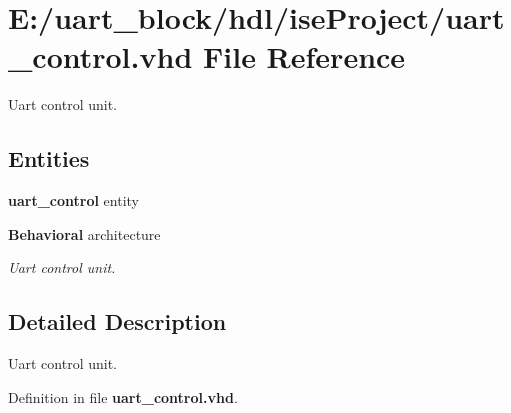 \section{E\-:/uart\-\_\-block/hdl/ise\-Project/uart\-\_\-control.vhd File Reference}
\label{uart__control_8vhd}


Uart control unit.  


\subsection*{Entities}
\begin{DoxyCompactItemize}
\item 
{\bf uart\-\_\-control} entity
\item 
{\bf Behavioral} architecture
\begin{DoxyCompactList}\small\item\em Uart control unit. \end{DoxyCompactList}\end{DoxyCompactItemize}


\subsection{Detailed Description}
Uart control unit. 

Definition in file {\bf uart\-\_\-control.\-vhd}.

